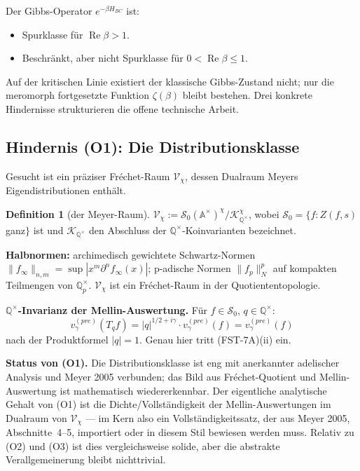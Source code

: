\documentclass[11pt,a4paper]{article}
\theoremstyle{plain}
\theoremstyle{definition}
\newtheorem{definition}[theorem]{Definition}
\newcommand{\Q}{\mathbb{Q}}
\newcommand{\A}{\mathbb{A}}
\newcommand{\V}{\mathcal{V}}
\renewcommand{\S}{\mathcal{S}}
\newcommand{\K}{\mathcal{K}}
\newcommand{\chifn}{\chi}
\renewcommand{\Re}{\operatorname{Re}}
\begin{document}
Der Gibbs-Operator $e^{-\beta H_{BC}}$ ist:
\begin{itemize}
\item Spurklasse für $\Re\beta > 1$.
\item Beschränkt, aber nicht Spurklasse für $0 < \Re\beta \leq 1$.
\end{itemize}

Auf der kritischen Linie existiert der klassische Gibbs-Zustand nicht;
nur die meromorph fortgesetzte Funktion $\zeta(\beta)$ bleibt bestehen.
Drei konkrete Hindernisse strukturieren die offene technische Arbeit.

\subsection{Hindernis (O1): Die Distributionsklasse}

Gesucht ist ein präziser Fréchet-Raum $\V_\chifn$, dessen Dualraum
Meyers Eigendistributionen enthält.

\begin{definition}[der Meyer-Raum]
\label{def:meyer-space}
$\V_\chifn := \S_0(\A^\times)^\chifn / \K_{\Q^\times}^\chifn$,
wobei $\S_0 = \{f : Z(f, s)$ ganz$\}$ ist und $\K_{\Q^\times}$ den
Abschluss der $\Q^\times$-Koinvarianten bezeichnet.
\end{definition}

\textbf{Halbnormen:} archimedisch gewichtete Schwartz-Normen
$\|f_\infty\|_{n,m} = \sup |x^m \partial^n f_\infty(x)|$; p-adische
Normen $\|f_p\|_N^p$ auf kompakten Teilmengen von $\Q_p^\times$.
$\V_\chifn$ ist ein Fréchet-Raum in der Quotiententopologie.

\textbf{$\Q^\times$-Invarianz der Mellin-Auswertung.} Für $f \in
\S_0$, $q \in \Q^\times$:
\[
  v_\gamma^{(pre)}(T_q f) = |q|^{1/2+i\gamma} \cdot
    v_\gamma^{(pre)}(f) = v_\gamma^{(pre)}(f)
\]
nach der Produktformel $|q| = 1$. Genau hier tritt (FST-7A)(ii) ein.

\textbf{Status von (O1).} Die Distributionsklasse ist eng mit
anerkannter adelischer Analysis und Meyer 2005 verbunden; das Bild aus
Fréchet-Quotient und Mellin-Auswertung ist mathematisch wiedererkennbar.
Der eigentliche analytische Gehalt von (O1) ist die Dichte/Vollständigkeit
der Mellin-Auswertungen im Dualraum von $\V_\chifn$ --- im Kern also ein
Vollständigkeitssatz, der aus Meyer 2005, Abschnitte~4--5, importiert oder
in diesem Stil bewiesen werden muss. Relativ zu (O2) und (O3) ist dies
vergleichsweise solide, aber die abstrakte Verallgemeinerung bleibt
nichttrivial.
\end{document}
